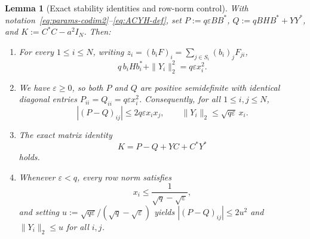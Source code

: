 \documentclass[11pt,reqno]{amsart}
\numberwithin{equation}{section}
\newtheorem{lemma}[theorem]{Lemma}
\theoremstyle{definition}
\theoremstyle{remark}
\begin{document}
\begin{lemma}[Exact stability identities and row-norm control]
\label{lem:stability}
With notation~\eqref{eq:params-codim2}--\eqref{eq:ACYH-def}, set $P := q\varepsilon BB^*$, $Q := qBHB^* + YY^*$, and $K := C^*C - a^2 I_N$. Then:
\begin{enumerate}[label=(\alph*),leftmargin=2em]
\item For every $1\le i\le N$, writing $z_i = (b_i F)_i = \sum_{j\in S_i}(b_i)_j F_{ji}$,
\begin{equation}
\label{eq:row-stab}
q\,b_i H b_i^* + \|Y_i\|_2^2 = q\varepsilon x_i^2.
\end{equation}
\item We have $\varepsilon\ge 0$, so both $P$ and $Q$ are positive semidefinite with identical diagonal entries $P_{ii}=Q_{ii}=q\varepsilon x_i^2$. Consequently, for all $1\le i,j\le N$,
\begin{equation}
\label{eq:PQ-Y-bounds}
|(P-Q)_{ij}| \le 2q\varepsilon x_i x_j,\qquad \|Y_i\|_2 \le \sqrt{q\varepsilon}\,x_i.
\end{equation}
\item The exact matrix identity
\begin{equation}
\label{eq:K-identity}
K = P - Q + YC + C^*Y^*
\end{equation}
holds.
\item Whenever $\varepsilon < q$, every row norm satisfies
\begin{equation}
\label{eq:xi-bound}
x_i \le \frac{1}{\sqrt{q}-\sqrt{\varepsilon}},
\end{equation}
and setting $u := \sqrt{q\varepsilon}/(\sqrt{q}-\sqrt{\varepsilon})$ yields $|(P-Q)_{ij}|\le 2u^2$ and $\|Y_i\|_2\le u$ for all $i,j$.
\end{enumerate}
\end{lemma}
\end{document}
